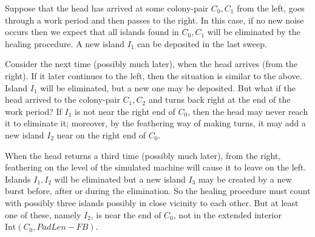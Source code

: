 \documentclass[11pt]{memoir}
\theoremstyle{definition} %
\def\B{B}
\newcommand{\F}{F}
\newcommand{\Int}{\mathrm{Int}} %
\newcommand{\PadLen}{\mathit{PadLen}} %
\begin{document}
\begin{example}\label{xpl:3-islands}
  Suppose that the head has arrived at some colony-pair \( C_{0},C_{1} \) from the left,
goes through a work period and then passes to the right.
In this case, if no new noise occurs then we expect that
all islands found in \( C_{0},C_{1} \) will be eliminated by the healing procedure.
A new island \( I_{1} \) can be deposited in the last sweep.

Consider the next time (possibly much later), when the head arrives (from the right).
If it later continues to the left, then the situation is similar to the above.
Island \( I_{1} \) will be eliminated, but a new one may be deposited.
But what if the head arrived to the colony-pair \( C_{1},C_{2} \) and
turns back right at the end of the work period?
If \( I_{1} \) is not near the right end of \( C_{0} \), then
the head may never reach it to eliminate it; moreover, by the
feathering way of making turns,
it may add a new island \( I_{2} \) near on the right end of \( C_{0} \).

When the head returns a third time (possibly much later), 
from the right, feathering on the level of the simulated machine will
cause it to leave on the left.
Islands \( I_{1},I_{2} \) will be eliminated but a new island
\( I_{3} \) may be created by a new burst before, after or during the elimination.
So the healing procedure must count with possibly three islands
possibly in close vicinity to each other.
But at least one of these, namely \( I_{2} \), is near the end of \( C_{0} \), not in
the extended interior \( \Int(C_{0},\PadLen-\F\B) \).
\end{example}
\end{document}

